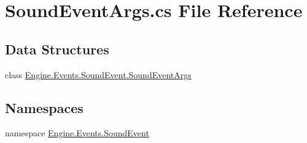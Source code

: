 \hypertarget{a00074}{}\section{Sound\+Event\+Args.\+cs File Reference}
\label{a00074}
\subsection*{Data Structures}
\begin{DoxyCompactItemize}
\item 
class \hyperlink{a00390}{Engine.\+Events.\+Sound\+Event.\+Sound\+Event\+Args}
\end{DoxyCompactItemize}
\subsection*{Namespaces}
\begin{DoxyCompactItemize}
\item 
namespace \hyperlink{a00250}{Engine.\+Events.\+Sound\+Event}
\end{DoxyCompactItemize}
